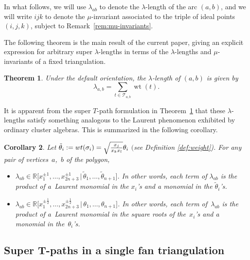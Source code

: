 \documentclass[11pt]{article}
\numberwithin{equation}{section}
\numberwithin{equation}{section}
\newtheorem{Theorem}{Theorem}[section]
\newtheorem{Corollary}[Theorem]{Corollary}
\DeclareMathOperator{\wt}{wt}
\begin{document}
 In what follows, we will use $\lambda_{ab}$ to denote the $\lambda$-length of the arc $(a,b)$,
 and we will write $\boxed{ijk}$ to denote the $\mu$-invariant associated to the triple of
 ideal points $(i,j,k)$, subject to Remark~\ref{rem:mu-invariants}.
	
The following theorem is the main result of the current paper, giving an explicit expression for arbitrary super $\lambda$-lengths
in terms of the $\lambda$-lengths and $\mu$-invariants of a fixed triangulation.

\begin{Theorem}\label{thm:main}
Under the default orientation,
 the $\lambda$-length of $(a,b)$ is given by
 \[\lambda_{a,b} = \sum_{t\in\mathcal T_{a,b}} \wt(t).
 \]
\end{Theorem}

\setcounter{Theorem}{10}
It is apparent from the super $T$-path formulation in Theorem~\ref{thm:main} that these $\lambda$-lengths satisfy something analogous
to the Laurent phenomenon exhibited by ordinary cluster algebras. This is summarized in the following corollary.

\begin{Corollary}\label{cor:laurent}
 Let $\tilde{\theta}_i := {\rm wt}(\sigma_i) = \sqrt{\frac{x_j}{x_kx_l}} \theta_i$ $($see Definition {\rm \ref{def:weight})}.
 For any pair of vertices~$a$,~$b$ of the polygon,
 \begin{itemize}\itemsep=0pt
 \item[$(a)$] $\lambda_{ab} \in {\mathbb R}\bigl[x_1^{\pm 1}, \dots, x_{2n+3}^{\pm 1} \,|\, \tilde{\theta}_1, \dots, \tilde{\theta}_{n+1}\bigr]$.
 In other words, each term of $\lambda_{ab}$ is the product of a~Laurent monomial
 in the $x_i$'s and a monomial in the $\tilde{\theta}_i$'s.
 \item[$(b)$] $\lambda_{ab} \in {\mathbb R}\bigl[x_{1}^{\pm \frac{1}{2}}, \dots, x_{2n+3}^{\pm \frac{1}{2}} \,|\, \theta_1, \dots, \theta_{n+1}\bigr]$.
 In other words, each term of~$\lambda_{ab}$ is the product of a~Laurent monomial in the square roots of the~$x_i$'s
 and a monomial in the~$\theta_i$'s.
 \end{itemize}
\end{Corollary}

\setcounter{Theorem}{12}\setcounter{figure}{11}
\subsection[Super T-paths in a single fan triangulation]{Super $\boldsymbol{T}$-paths in a single fan triangulation}
\end{document}
